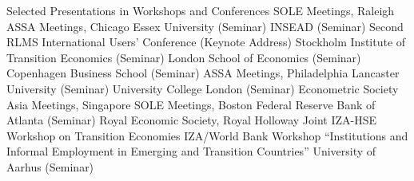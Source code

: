 
\def\arraystretch{1.3}

\begin{rubric}{Selected Presentations in Workshops and Conferences}
 SOLE Meetings, Raleigh
 ASSA Meetings, Chicago
 Essex University (Seminar)
 INSEAD (Seminar)
 Second RLMS International Users' Conference (Keynote Address)
 Stockholm Institute of Transition Economics (Seminar)
 London School of Economics (Seminar)
 Copenhagen Business School (Seminar)
 ASSA Meetings, Philadelphia
 Lancaster University (Seminar)
 University College London (Seminar)
 Econometric Society Asia Meetings, Singapore
 SOLE Meetings, Boston
 Federal Reserve Bank of Atlanta (Seminar)
 Royal Economic Society, Royal Holloway
 Joint IZA-HSE Workshop on Transition Economies
 IZA/World Bank Workshop ``Institutions and Informal Employment in Emerging and Transition Countries''
 University of Aarhus (Seminar)
\end{rubric}
